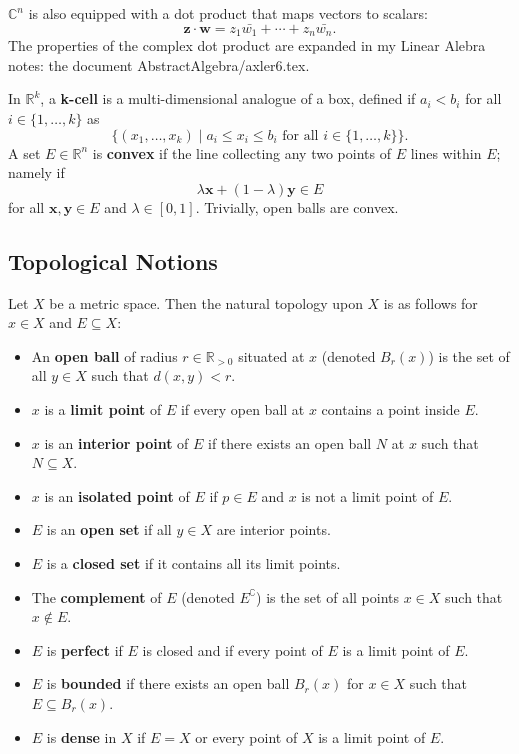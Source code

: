 \documentclass[11pt]{article}
\renewcommand{\vec}[1]{\mathbf{#1}}
\newcommand{\conjugate}[1]{\bar{#1}}
\begin{document}
$\mathbb{C}^{n}$ is also equipped with a dot product that maps vectors to scalars:
\[
	\vec{z} \cdot \vec{w} = z_{1} \conjugate{w_{1}} + \cdots + z_{n} \conjugate{w_{n}}.
\]
The properties of the complex dot product are expanded in my Linear Alebra notes: the document AbstractAlgebra/axler6.tex.

\newpage

In $\mathbb{R}^{k}$, a \textbf{k-cell} is a multi-dimensional analogue of a box, defined if $a_{i} < b_{i}$ for all $i \in \{ 1, \ldots, k \}$ as 
\[
	\{ (x_{1}, \ldots, x_{k}) \mid a_{i} \le x_{i} \le b_{i} \text{ for all } i \in \{ 1, \ldots, k \} \}.
\]
A set $E \in \mathbb{R}^{n}$ is \textbf{convex} if the line collecting any two points of $E$ lines within $E$; namely if
\[
	\lambda \vec{x} + (1 - \lambda) \vec{y} \in E
\]
for all $\vec{x}, \vec{y} \in E$ and $\lambda \in [0, 1]$. Trivially, open balls are convex.


\subsection{Topological Notions}

Let $X$ be a metric space. Then the natural topology upon $X$ is as follows for $x \in X$ and $E \subseteq X$:
\begin{itemize}
	\item An \textbf{open ball} of radius $r \in \mathbb{R}_{> 0}$ situated at $x$ (denoted $B_{r}(x)$) is the set of all $y \in X$ such that $d(x, y) < r$. 
	\item $x$ is a \textbf{limit point} of $E$ if every open ball at $x$ contains a point inside $E$.
	\item $x$ is an \textbf{interior point} of $E$ if there exists an open ball $N$ at $x$ such that $N \subseteq X$.
	\item $x$ is an \textbf{isolated point} of $E$ if $p \in E$ and $x$ is not a limit point of $E$.
	\item $E$ is an \textbf{open set} if all $y \in X$ are interior points.
	\item $E$ is a \textbf{closed set} if it contains all its limit points.
	\item The \textbf{complement} of $E$ (denoted $E^{\complement}$) is the set of all points $x \in X$ such that $x \notin E$.
	\item $E$ is \textbf{perfect} if $E$ is closed and if every point of $E$ is a limit point of $E$.
	\item $E$ is \textbf{bounded} if there exists an open ball $B_{r}(x)$ for $x \in X$ such that $E \subseteq B_{r}(x)$.
	\item $E$ is \textbf{dense} in $X$ if $E = X$ or every point of $X$ is a limit point of $E$.
\end{itemize}
\end{document}
